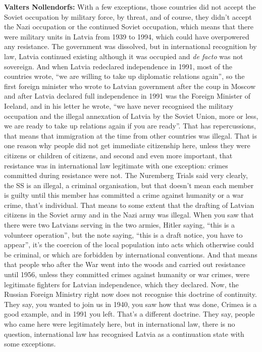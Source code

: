 \textbf{Valters Nollendorfs:} With a few exceptions, those countries did not accept the Soviet occupation by military force, by threat, and of course, they didn't accept the Nazi occupation or the continued Soviet occupation, which means that there were military units in Latvia from 1939 to 1994, which could have overpowered any resistance. The government was dissolved, but in international recognition by law, Latvia continued existing although it was occupied and \textit{de facto} was not sovereign. And when Latvia redeclared independence in 1991, most of the countries wrote, ``we are willing to take up diplomatic relations again'', so the first foreign minister who wrote to Latvian government after the coup in Moscow and after Latvia declared full independence in 1991 was the Foreign Minister of Iceland, and in his letter he wrote, ``we have never recognised the military occupation and the illegal annexation of Latvia by the Soviet Union, more or less, we are ready to take up relations again if you are ready''. That has repercussions, that means that immigration at the time from other countries was illegal. That is one reason why people did not get immediate citizenship here, unless they were citizens or children of citizens, and second and even more important, that resistance was in international law legitimate with one exception: crimes committed during resistance were not. The Nuremberg Trials said very clearly, the SS is an illegal, a criminal organisation, but that doesn't mean each member is guilty until this member has committed a crime against humanity or a war crime, that's individual. That means to some extent that the drafting of Latvian citizens in the Soviet army and in the Nazi army was illegal. When you saw that there were two Latvians serving in the two armies, Hitler saying, ``this is a volunteer operation'', but the note saying, ``this is a draft notice, you have to appear'', it's the coercion of the local population into acts which otherwise could be criminal, or which are forbidden by international conventions. And that means that people who after the War went into the woods and carried out resistance until 1956, unless they committed crimes against humanity or war crimes, were legitimate fighters for Latvian independence, which they declared. Now, the Russian Foreign Ministry right now does not recognise this doctrine of continuity. They say, you wanted to join us in 1940, you saw how that was done, Crimea is a good example, and in 1991 you left. That's a different doctrine. They say, people who came here were legitimately here, but in international law, there is no question, international law has recognised Latvia as a continuation state with some exceptions. 

